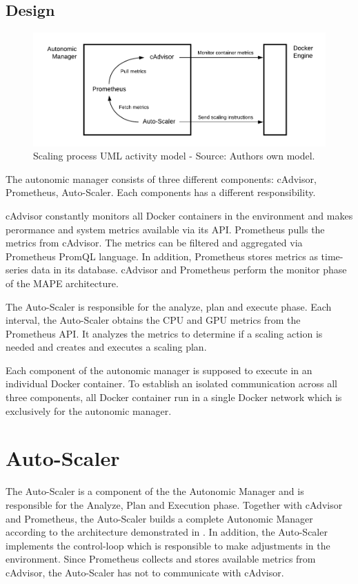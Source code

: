 \subsection{Design}

\begin{figure}[h]%
\centering
\includegraphics[scale=0.85]{images/04_conceptual_design/autonomic_manager/autonomic_manager_overview}%
\caption{Scaling process UML activity model - Source: Authors own model.}%
\label{fig:am-design-component}%
\end{figure}

The autonomic manager consists of three different components: cAdvisor, Prometheus, Auto-Scaler. Each components has a different responsibility. 


cAdvisor constantly monitors all Docker containers in the environment and makes perormance and system metrics available via its API.
Prometheus pulls the metrics from cAdvisor. The metrics can be filtered and aggregated via Prometheus PromQL language. In addition, Prometheus stores metrics as time-series data in its database.
cAdvisor and Prometheus perform the monitor phase of the MAPE architecture.


The Auto-Scaler is responsible for the analyze, plan and execute phase. Each interval, the Auto-Scaler obtains the CPU and GPU metrics from the Prometheus API. It analyzes the metrics to determine if a scaling action is needed and creates and executes a scaling plan.


Each component of the autonomic manager is supposed to execute in an individual Docker container. To establish an isolated communication across all three components, all Docker container run in a single Docker network which is exclusively for the autonomic manager.


\section{Auto-Scaler}
The Auto-Scaler is a component of the the Autonomic Manager and is responsible for the Analyze, Plan and Execution phase.
Together with cAdvisor and Prometheus, the Auto-Scaler builds a complete Autonomic Manager according to the architecture demonstrated in .
In addition, the Auto-Scaler implements the control-loop which is responsible to make adjustments in the environment.
Since Prometheus collects and stores available metrics from cAdvisor,  the Auto-Scaler has not to communicate with cAdvisor.

